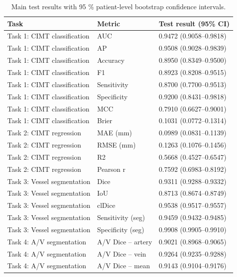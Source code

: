 \begin{table}
\caption{Main test results with 95 \% patient-level bootstrap confidence intervals.}
\label{tab:main_test_results}
\begin{tabular}{lll}
\toprule
Task & Metric & Test result (95\% CI) \\
\midrule
Task 1: CIMT classification & AUC & 0.9472 (0.9058–0.9818) \\
Task 1: CIMT classification & AP & 0.9508 (0.9028–0.9839) \\
Task 1: CIMT classification & Accuracy & 0.8950 (0.8349–0.9500) \\
Task 1: CIMT classification & F1 & 0.8923 (0.8208–0.9515) \\
Task 1: CIMT classification & Sensitivity & 0.8700 (0.7700–0.9513) \\
Task 1: CIMT classification & Specificity & 0.9200 (0.8431–0.9818) \\
Task 1: CIMT classification & MCC & 0.7910 (0.6627–0.9001) \\
Task 1: CIMT classification & Brier & 0.1031 (0.0772–0.1314) \\
Task 2: CIMT regression & MAE (mm) & 0.0989 (0.0831–0.1139) \\
Task 2: CIMT regression & RMSE (mm) & 0.1263 (0.1076–0.1456) \\
Task 2: CIMT regression & R2 & 0.5668 (0.4527–0.6547) \\
Task 2: CIMT regression & Pearson r & 0.7592 (0.6983–0.8192) \\
Task 3: Vessel segmentation & Dice & 0.9311 (0.9288–0.9332) \\
Task 3: Vessel segmentation & IoU & 0.8713 (0.8674–0.8749) \\
Task 3: Vessel segmentation & clDice & 0.9538 (0.9517–0.9557) \\
Task 3: Vessel segmentation & Sensitivity (seg) & 0.9459 (0.9432–0.9485) \\
Task 3: Vessel segmentation & Specificity (seg) & 0.9908 (0.9905–0.9910) \\
Task 4: A/V segmentation & A/V Dice – artery & 0.9021 (0.8968–0.9065) \\
Task 4: A/V segmentation & A/V Dice – vein & 0.9264 (0.9235–0.9288) \\
Task 4: A/V segmentation & A/V Dice – mean & 0.9143 (0.9104–0.9176) \\
\bottomrule
\end{tabular}
\end{table}
